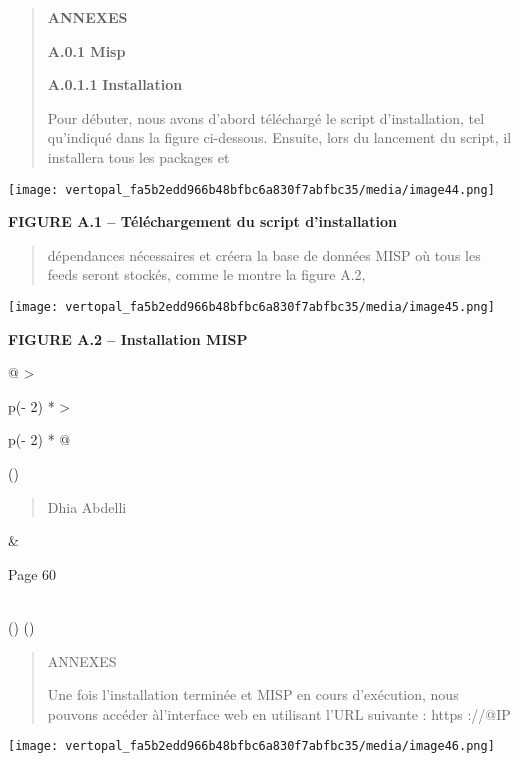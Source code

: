 \documentclass[
]{article}
\begin{document}
\begin{quote}
\textbf{ANNEXES}

\textbf{A.0.1 Misp}

\textbf{A.0.1.1} \textbf{Installation}

Pour débuter, nous avons d'abord téléchargé le script d'installation,
tel qu'indiqué dans la figure ci-dessous. Ensuite, lors du lancement du
script, il installera tous les packages et
\end{quote}

\texttt{[image: vertopal\_fa5b2edd966b48bfbc6a830f7abfbc35/media/image44.png]}

\textbf{FIGURE A.1 -- Téléchargement du script d'installation}

\begin{quote}
dépendances nécessaires et créera la base de données MISP où tous les
feeds seront stockés, comme le montre la figure A.2,
\end{quote}

\texttt{[image: vertopal\_fa5b2edd966b48bfbc6a830f7abfbc35/media/image45.png]}

\textbf{FIGURE A.2 -- Installation MISP}

\begin{longtable}[]{@{}
  >{\raggedright\arraybackslash}p{(\columnwidth - 2\tabcolsep) * }
  >{\raggedright\arraybackslash}p{(\columnwidth - 2\tabcolsep) * }@{}}
\toprule()
\begin{minipage}[b]{\linewidth}\raggedright
\begin{quote}
Dhia Abdelli
\end{quote}
\end{minipage} & \begin{minipage}[b]{\linewidth}\raggedright
Page 60
\end{minipage} \\
\midrule()
\endhead
\bottomrule()
\end{longtable}

\begin{quote}
ANNEXES

Une fois l'installation terminée et MISP en cours d'exécution, nous
pouvons accéder àl'interface web en utilisant l'URL suivante : https
://@IP
\end{quote}

\texttt{[image: vertopal\_fa5b2edd966b48bfbc6a830f7abfbc35/media/image46.png]}
\end{document}

